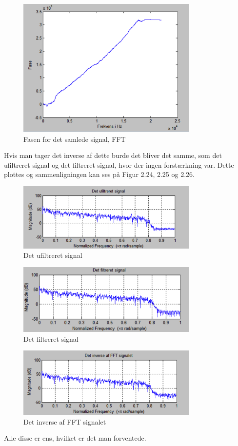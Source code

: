 \begin{figure}[H]
	\centering
	\includegraphics[width=0.8\textwidth]{Figur/Snip20151111_85}
	\caption{Fasen for det samlede signal, FFT}
\end{figure}

Hvis man tager det inverse af dette burde det bliver det samme, som det ufiltreret signal og det filtreret signal, hvor der ingen forstærkning var.
Dette plottes og sammenligningen kan ses på Figur 2.24, 2.25 og 2.26. 

\begin{figure}[H]
	\centering
	\includegraphics[width=0.8\textwidth]{Figur/Snip20151111_68}
	\caption{Det ufiltreret signal}
\end{figure}

\begin{figure}[H]
	\centering
	\includegraphics[width=0.8\textwidth]{Figur/Snip20151111_69}
	\caption{Det filtreret signal}
\end{figure}

\begin{figure}[H]
	\centering
	\includegraphics[width=0.8\textwidth]{Figur/Snip20151111_87}
	\caption{Det inverse af FFT signalet}
\end{figure}

Alle disse er ens, hvilket er det man forventede. 










